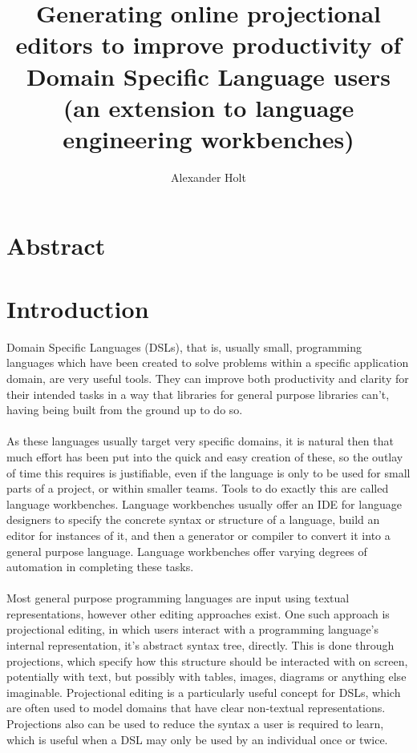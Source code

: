 \documentclass{article}
\begin{document}
\newcommand{\RSetup}[0]{R1\xspace}
\newcommand{\RCustom}[0]{R2\xspace}
\newcommand{\RLightweight}[0]{R3\xspace}
\newcommand{\RIntuitive}[0]{R4\xspace}
\newcommand{\RFamiliarity}{R5\xspace}

\title{Generating online projectional editors to improve productivity of
Domain Specific Language users (an extension to language engineering
workbenches)}
\author{Alexander Holt}
\maketitle

%
\section*{Abstract}
\clearpage
\tableofcontents
\clearpage

\section{Introduction}

Domain Specific Languages (DSLs), that is, usually small, programming languages which have been created to solve problems within a specific application domain, are very useful tools. They can improve both productivity and clarity for their intended tasks in a way that libraries for general purpose libraries can't, having being built from the ground up to do so. 
\\
\\
As these languages usually target very specific domains, it is natural then that much effort has been put into the quick and easy creation of these, so the outlay of time this requires is justifiable, even if the language is only to be used for small parts of a project, or within smaller teams. Tools to do exactly this are called language workbenches. Language workbenches usually offer an IDE for language designers to specify the concrete syntax or structure of a language, build an editor for instances of it, and then a generator or compiler to convert it into a general purpose language. Language workbenches offer varying degrees of automation in completing these tasks.
\\
\\
Most general purpose programming languages are input using textual representations, however other editing approaches exist. One such approach is projectional editing, in which users interact with a programming language's internal representation, it's abstract syntax tree, directly. This is done through projections, which specify how this structure should be interacted with on screen, potentially with text, but possibly with tables, images, diagrams or anything else imaginable. Projectional editing is a particularly useful concept for DSLs, which are often used to model domains that have clear non-textual representations. Projections also can be used to reduce the syntax a user is required to learn, which is useful when a DSL may only be used by an individual once or twice.
\end{document}
